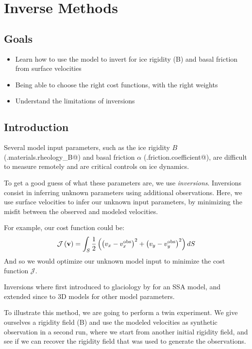 \section{Inverse Methods}
\subsection{Goals} %
\begin{itemize}
	\item Learn how to use the model to invert for ice rigidity (B) and basal friction from surface velocities
	\item Being able to choose the right cost functions, with the right weights
	\item Understand the limitations of inversions
\end{itemize}
\subsection{Introduction}%
Several model input parameters, such as the ice rigidity $B$ (\verb@md.materials.rheology_B@) and basal friction $\alpha$ (\verb@md.friction.coefficient@), are difficult to measure remotely and are critical controls on ice dynamics.

To get a good guess of what these parameters are, we use \emph{inversions}. Inversions consist in inferring unknown parameters using additional observations. Here, we use surface velocities to infer our unknown input parameters, by minimizing the misfit between the observed and modeled velocities.

For example, our cost function could be:
\begin{equation}
	{\mathcal J\left({\bf v}\right)}
	=\int_{S} \dfrac{1}{2}\left(
	\left(v_x-v_x^{\text{obs}}\right)^{2}
	+\left(v_y-v_y^{\text{obs}}\right)^{2}
	\right) dS
\end{equation}
And so we would optimize our unknown model input to minimize the cost function ${\mathcal J}$.

Inversions where first introduced to glaciology by \cite{MacAyeal1993a} for an SSA model, and extended since to 3D models for other model parameters.

To illustrate this method, we are going to perform a twin experiment. We give ourselves a rigidity field (B) and use the modeled velocities as synthetic observation in a second run, where we start from another initial rigidity field, and see if we can recover the rigidity field that was used to generate the observations.
